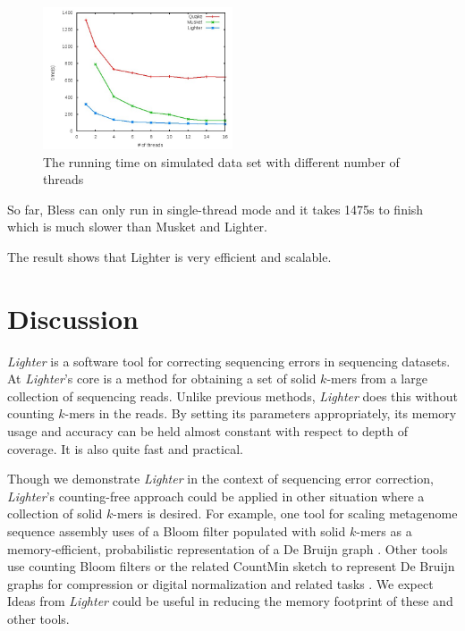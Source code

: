 \documentclass[10pt]{article}
\begin{document}
\begin{figure}[h!]
\begin{center}
\includegraphics[width=0.5\textwidth]{runtime.jpg}
\end{center}
\caption{The running time on simulated data set with different number of threads\label{fig:runtime}}
\end{figure}

So far, Bless can only run in single-thread mode and it takes 1475s to finish which is much slower than Musket and Lighter.

The result shows that Lighter is very efficient and scalable. 

\section*{Discussion}
\emph{Lighter} is a software tool for correcting sequencing errors in sequencing datasets.
At \emph{Lighter}'s core is a method for obtaining a set of solid $k$-mers from a large collection of sequencing reads.
Unlike previous methods, \emph{Lighter} does this without counting $k$-mers in the reads.
By setting its parameters appropriately, its memory usage and accuracy can be held almost constant with respect to depth of coverage.
It is also quite fast and practical.

Though we demonstrate \emph{Lighter} in the context of sequencing error correction, \emph{Lighter}'s counting-free approach could be applied in other situation where a collection of solid $k$-mers is desired.
For example, one tool for scaling metagenome sequence assembly uses of a Bloom filter populated with solid $k$-mers as a memory-efficient, probabilistic representation of a De Bruijn graph \cite{pell2012scaling}.
Other tools use counting Bloom filters \cite{fan2000summary, bonomi2006improved} or the related CountMin sketch \cite{cormode2005improved} to represent De Bruijn graphs for compression \cite{jones2012compression} or digital normalization and related tasks \cite{zhang2013these}.
We expect Ideas from \emph{Lighter} could be useful in reducing the memory footprint of these and other tools. 
\end{document}
